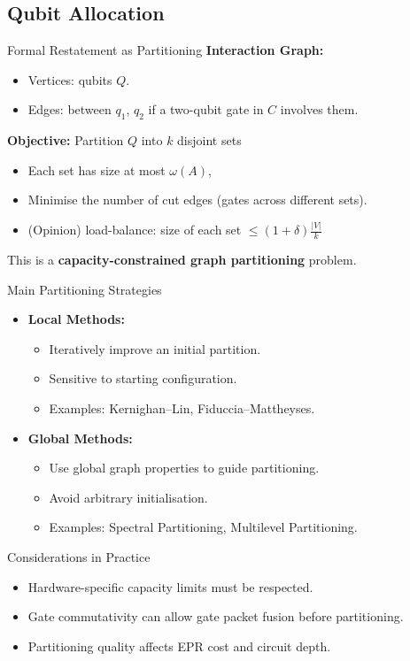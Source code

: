 \documentclass{beamer}
\begin{document}
	\subsection{Qubit Allocation}
	
	\begin{frame}{Formal Restatement as Partitioning}
		\textbf{Interaction Graph:}
		\begin{itemize}
			\item Vertices: qubits $Q$.
			\item Edges: between $q_1$, $q_2$ if a two-qubit gate in $C$ involves them.
		\end{itemize}
		
		\textbf{Objective:} Partition $Q$ into $k$ disjoint sets
		\begin{itemize}
			\item Each set has size at most $\omega(A)$,
			\item Minimise the number of cut edges (gates across different sets).
			\item (Opinion) load-balance: size of each set $\le (1+\delta)\frac{|V|}{k}$
		\end{itemize}
		This is a \textbf{capacity-constrained graph partitioning} problem.
	\end{frame}
	
	\begin{frame}{Main Partitioning Strategies}
		\begin{itemize}
			\item \textbf{Local Methods:}
			\begin{itemize}
				\item Iteratively improve an initial partition.
				\item Sensitive to starting configuration.
				\item Examples: Kernighan–Lin, Fiduccia–Mattheyses.
			\end{itemize}
			\item \textbf{Global Methods:}
			\begin{itemize}
				\item Use global graph properties to guide partitioning.
				\item Avoid arbitrary initialisation.
				\item Examples: Spectral Partitioning, Multilevel Partitioning.
			\end{itemize}
		\end{itemize}
	\end{frame}
	
	
	\begin{frame}{Considerations in Practice}
		\begin{itemize}
			\item Hardware-specific capacity limits must be respected.
			\item Gate commutativity can allow gate packet fusion before partitioning.
			\item Partitioning quality affects EPR cost and circuit depth.
		\end{itemize}
	\end{frame}
	
\end{document}
